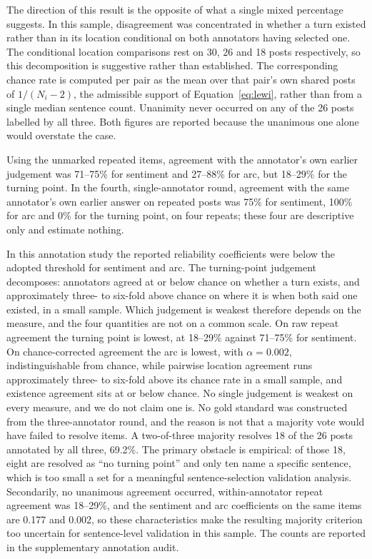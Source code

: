 \documentclass[fleqn,10pt]{wlscirep}
\begin{document}
The direction of this result is the opposite of what a single mixed percentage suggests. In this sample, disagreement was concentrated in whether a turn existed rather than in its location conditional on both annotators having selected one. The conditional location comparisons rest on 30, 26 and 18 posts respectively, so this decomposition is suggestive rather than established. The corresponding chance rate is computed per pair as the mean over that pair's own shared posts of $1/(N_i-2)$, the admissible support of Equation~\eqref{eq:lewi}, rather than from a single median sentence count. Unanimity never occurred on any of the 26 posts labelled by all three. Both figures are reported because the unanimous one alone would overstate the case.

Using the unmarked repeated items, agreement with the annotator's own earlier judgement was 71--75\% for sentiment and 27--88\% for arc, but 18--29\% for the turning point. In the fourth, single-annotator round, agreement with the same annotator's own earlier answer on repeated posts was 75\% for sentiment, 100\% for arc and 0\% for the turning point, on four repeats; these four are descriptive only and estimate nothing.

In this annotation study the reported reliability coefficients were below the adopted threshold for sentiment and arc. The turning-point judgement decomposes: annotators agreed at or below chance on whether a turn exists, and approximately three- to six-fold above chance on where it is when both said one existed, in a small sample. Which judgement is weakest therefore depends on the measure, and the four quantities are not on a common scale. On raw repeat agreement the turning point is lowest, at 18--29\% against 71--75\% for sentiment. On chance-corrected agreement the arc is lowest, with $\alpha = 0.002$, indistinguishable from chance, while pairwise location agreement runs approximately three- to six-fold above its chance rate in a small sample, and existence agreement sits at or below chance. No single judgement is weakest on every measure, and we do not claim one is. No gold standard was constructed from the three-annotator round, and the reason is not that a majority vote would have failed to resolve items. A two-of-three majority resolves 18 of the 26 posts annotated by all three, 69.2\%. The primary obstacle is empirical: of those 18, eight are resolved as ``no turning point'' and only ten name a specific sentence, which is too small a set for a meaningful sentence-selection validation analysis. Secondarily, no unanimous agreement occurred, within-annotator repeat agreement was 18--29\%, and the sentiment and arc coefficients on the same items are 0.177 and 0.002, so these characteristics make the resulting majority criterion too uncertain for sentence-level validation in this sample. The counts are reported in the supplementary annotation audit.
\end{document}
